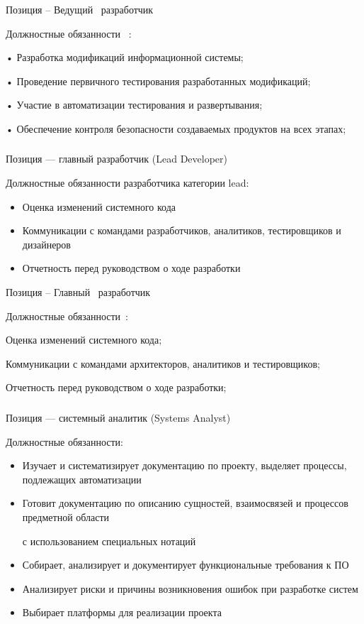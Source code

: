 \documentclass{../industrial-development}
\begin{document}
\lecturenotes

Позиция – Ведущий~\cite{hh} разработчик~\cite{itcf}

Должностные обязанности~\cite{rab} :

• Разработка модификаций  информационной системы;

• Проведение первичного тестирования разработанных модификаций;

• Участие в автоматизации тестирования и развертывания;

• Обеспечение контроля безопасности создаваемых продуктов на всех этапах;

\begin{frame} \frametitle{}
 \begin{block}{}
  \alert{Позиция --- главный разработчик (Lead Developer)}

Должностные обязанности разработчика категории lead: 
  \end{block}
  \begin{itemize}
  \item Оценка изменений системного кода
  \item Коммуникации с командами разработчиков, аналитиков, тестировщиков и дизайнеров
 \item  Отчетность перед руководством о ходе разработки
  \end{itemize}
\end{frame}

\lecturenotes

Позиция – Главный~\cite{hh} разработчик~\cite{itcf}

Должностные обязанности~\cite{rab}:

Оценка изменений системного кода;

Коммуникации с командами архитекторов, аналитиков и тестировщиков;

Отчетность перед руководством о ходе разработки; 

\begin{frame} \frametitle{}
 \begin{block}{}
  \alert{Позиция --- системный аналитик (Systems Analyst)}

Должностные обязанности: 
  \end{block}
  \begin{itemize}
\item  Изучает и систематизирует документацию по проекту, выделяет процессы, подлежащих автоматизации
 \item Готовит документацию по описанию сущностей, взаимосвязей и процессов предметной области 

с использованием специальных нотаций
  \item Собирает, анализирует и документирует функциональные требования к ПО
  \item Анализирует риски и причины возникновения ошибок при разработке систем
  \item Выбирает платформы для реализации проекта
  \end{itemize}
\end{frame}
\end{document}

